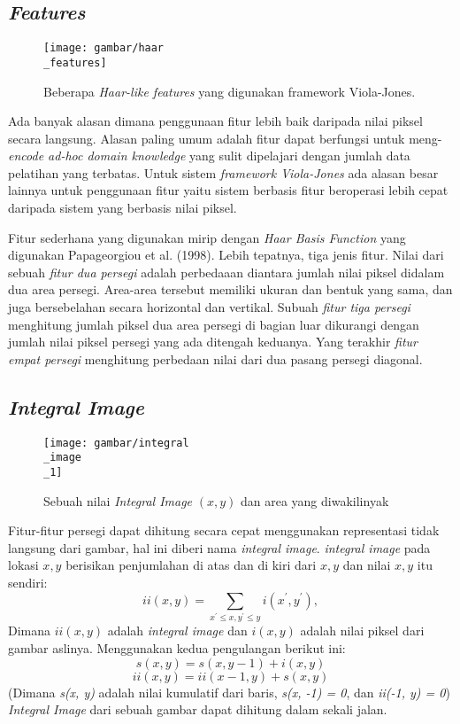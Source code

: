 \subsection{\emph{Features}}

\begin{figure}[H]
  \centering{}
	\texttt{[image: gambar/haar\\\_features]}
  \caption{Beberapa \emph{Haar-like features} yang digunakan framework Viola-Jones.}
\end{figure}

Ada banyak alasan dimana penggunaan fitur lebih baik daripada 
nilai piksel secara langsung. Alasan paling umum adalah fitur dapat berfungsi
untuk meng-\emph{encode ad-hoc domain knowledge} yang sulit dipelajari 
dengan jumlah data pelatihan yang terbatas. Untuk sistem \emph{framework Viola-Jones} 
ada alasan besar lainnya untuk penggunaan fitur yaitu sistem berbasis fitur beroperasi lebih cepat
daripada sistem yang berbasis nilai piksel.

Fitur sederhana yang digunakan mirip dengan \emph{Haar Basis Function} yang 
digunakan Papageorgiou et al. (1998). Lebih tepatnya, tiga jenis fitur. 
Nilai dari sebuah \emph{fitur dua persegi} adalah perbedaaan diantara 
jumlah nilai piksel didalam dua area persegi. Area-area tersebut memiliki 
ukuran dan bentuk yang sama, dan juga bersebelahan secara horizontal dan vertikal.
Subuah \emph{fitur tiga persegi} menghitung jumlah piksel dua area persegi 
di bagian luar dikurangi dengan jumlah nilai piksel persegi yang ada ditengah keduanya. 
Yang terakhir \emph{fitur empat persegi} menghitung perbedaan nilai dari dua pasang 
persegi diagonal.

\subsection{\emph{Integral Image}}

\begin{figure}[H]
  \centering{}
	\texttt{[image: gambar/integral\\\_image\\\_1]}
  \caption{Sebuah nilai \emph{Integral Image} $(x,y)$ dan area yang diwakilinyak}
\end{figure}

Fitur-fitur persegi dapat dihitung secara cepat menggunakan 
representasi tidak langsung dari gambar, hal ini diberi nama 
\emph{integral image}. \emph{integral image} pada lokasi $x, y$ berisikan 
penjumlahan di atas dan di kiri dari $x, y$ dan nilai $x, y$ itu sendiri:
\begin{equation}
  i i(x, y)=\sum_{x^{\prime} \leq x, y^{\prime} \leq y} i\left(x^{\prime}, y^{\prime}\right),
\end{equation}
Dimana $ii(x,y)$ adalah \emph{integral image} dan $i(x,y)$ 
adalah nilai piksel dari gambar aslinya. Menggunakan kedua 
pengulangan berikut ini:
\begin{equation}
  s(x, y)=s(x, y-1) + i(x, y)
\end{equation}
\begin{equation}
  ii(x, y)=ii(x-1, y) + s(x, y)
\end{equation}
(Dimana \emph{s(x, y)} adalah nilai kumulatif dari baris, \emph{s(x, -1) = 0}, 
dan \emph{ii(-1, y) = 0}) \emph{Integral Image} dari sebuah gambar dapat dihitung dalam sekali jalan.


